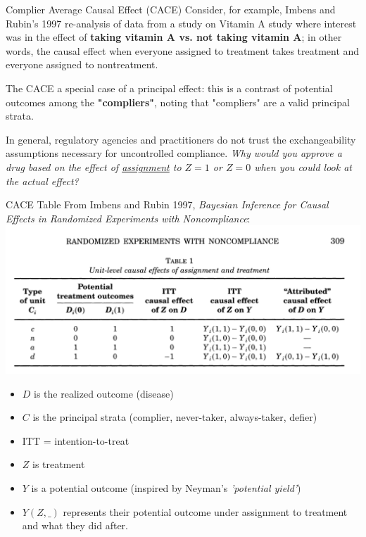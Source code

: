 \documentclass[10pt]{beamer}
\begin{document}
\begin{frame}{Complier Average Causal Effect (CACE)}
Consider, for example, Imbens and Rubin's 
1997 re-analysis of data from a study on Vitamin A study where interest
was in the effect of \textbf{taking vitamin A vs. not taking vitamin A};
in other words, the causal effect when everyone assigned to 
treatment takes treatment and everyone assigned to nontreatment.

The CACE a special case of a principal effect:  this is a contrast 
of potential outcomes among the \textbf{"compliers"}, noting that "compliers" are a valid 
principal strata.

{\footnotesize *In general, regulatory agencies and practitioners do not 
trust the exchangeability assumptions necessary for uncontrolled compliance. 
\textit{Why would you approve a drug based on the effect of \underline{assignment}
to $Z=1$ or $Z=0$ when you could look at the actual effect?}}
\end{frame}

\begin{frame}{CACE Table}
From Imbens and Rubin 1997, \textit{Bayesian Inference for Causal Effects in Randomized Experiments with Noncompliance}:
\includegraphics[width=\textwidth]{figures/cace_figure/cace_table.png}

\scriptsize
\begin{itemize}
\item $D$ is the realized outcome (disease)
\item $C$ is the principal strata (complier, never-taker, always-taker, defier)
\item ITT = intention-to-treat
\item $Z$ is treatment
\item $Y$ is a potential outcome (inspired by Neyman's \textit{'potential yield'}) 
\item $Y(Z, \_)$ represents their potential outcome under assignment to treatment and what they did after. 
\end{itemize}
\normalsize

\end{frame}
\end{document}
